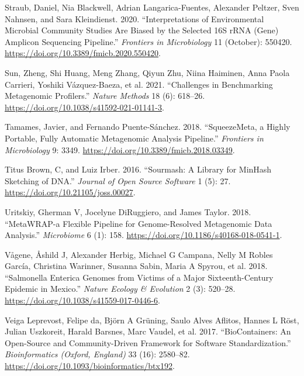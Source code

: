 \documentclass[
]{article}
\newlength{\cslhangindent}
\newlength{\cslentryspacingunit} %
\newenvironment{CSLReferences}[2] %
 {%
  \setlength{\parindent}{0pt}
  \ifodd #1
  \let\oldpar\par
  \def\par{\hangindent=\cslhangindent\oldpar}
  \fi
  \setlength{\parskip}{#2\cslentryspacingunit}
 }%
 {}
\begin{document}
\begin{CSLReferences}{1}{0}
\leavevmode{}%
Straub, Daniel, Nia Blackwell, Adrian Langarica-Fuentes, Alexander
Peltzer, Sven Nahnsen, and Sara Kleindienst. 2020. {``Interpretations of
Environmental Microbial Community Studies Are Biased by the Selected
{16S} {rRNA} (Gene) Amplicon Sequencing Pipeline.''} \emph{Frontiers in
Microbiology} 11 (October): 550420.
\url{https://doi.org/10.3389/fmicb.2020.550420}.

\leavevmode{}%
Sun, Zheng, Shi Huang, Meng Zhang, Qiyun Zhu, Niina Haiminen, Anna Paola
Carrieri, Yoshiki Vázquez-Baeza, et al. 2021. {``Challenges in
Benchmarking Metagenomic Profilers.''} \emph{Nature Methods} 18 (6):
618--26. \url{https://doi.org/10.1038/s41592-021-01141-3}.

\leavevmode{}%
Tamames, Javier, and Fernando Puente-Sánchez. 2018. {``{SqueezeMeta}, a
Highly Portable, Fully Automatic Metagenomic Analysis Pipeline.''}
\emph{Frontiers in Microbiology} 9: 3349.
\url{https://doi.org/10.3389/fmicb.2018.03349}.

\leavevmode{}%
Titus Brown, C, and Luiz Irber. 2016. {``Sourmash: A Library for
{MinHash} Sketching of {DNA}.''} \emph{Journal of Open Source Software}
1 (5): 27. \url{https://doi.org/10.21105/joss.00027}.

\leavevmode{}%
Uritskiy, Gherman V, Jocelyne DiRuggiero, and James Taylor. 2018.
{``{MetaWRAP}-a Flexible Pipeline for Genome-Resolved Metagenomic Data
Analysis.''} \emph{Microbiome} 6 (1): 158.
\url{https://doi.org/10.1186/s40168-018-0541-1}.

\leavevmode{}%
Vågene, Åshild J, Alexander Herbig, Michael G Campana, Nelly M Robles
García, Christina Warinner, Susanna Sabin, Maria A Spyrou, et al. 2018.
{``Salmonella Enterica Genomes from Victims of a Major Sixteenth-Century
Epidemic in Mexico.''} \emph{Nature Ecology \& Evolution} 2 (3):
520--28. \url{https://doi.org/10.1038/s41559-017-0446-6}.

\leavevmode{}%
Veiga Leprevost, Felipe da, Björn A Grüning, Saulo Alves Aflitos, Hannes
L Röst, Julian Uszkoreit, Harald Barsnes, Marc Vaudel, et al. 2017.
{``{BioContainers}: An Open-Source and Community-Driven Framework for
Software Standardization.''} \emph{Bioinformatics (Oxford, England)} 33
(16): 2580--82. \url{https://doi.org/10.1093/bioinformatics/btx192}.


\end{CSLReferences}
\end{document}
